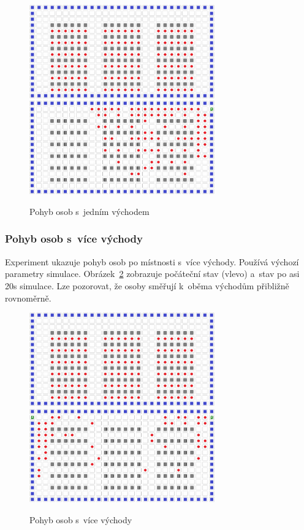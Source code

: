 \documentclass[11pt, titlepage, a4paper]{article}
\begin{document}
        \begin{figure}[H]
            \includegraphics[width=8cm]{gui_initial_state}
            \includegraphics[width=8cm]{TestLayouts/oneExit_noFire}
            \caption{Pohyb osob s~jedním východem}
            \label{oneExit_noFire}
        \end{figure}

        \subsubsection{Pohyb osob s~více východy}
        Experiment ukazuje pohyb osob po místnosti s~více východy. Používá výchozí parametry simulace. Obrázek~\ref{twoExits_noFire} zobrazuje počáteční stav (vlevo) a~stav po asi 20s simulace. Lze pozorovat, že osoby směřují k~oběma východům přibližně rovnoměrně.\\

        \begin{figure}[H]
            \includegraphics[width=8cm]{gui_initial_state}
            \includegraphics[width=8cm]{TestLayouts/twoExits_noFire}
            \caption{Pohyb osob s~více východy}
            \label{twoExits_noFire}
        \end{figure}
\end{document}
